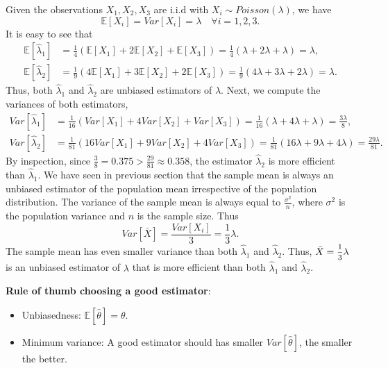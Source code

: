 \begin{solution}
    Given the observations $X_1, X_2, X_3$ are i.i.d with $X_i \sim Poisson(\lambda)$, we have
    \[
        \mathbb{E}[X_i] = Var[X_i] = \lambda \quad \forall i = 1,2,3.
    \]
    It is easy to see that 
    \begin{align*}
        \mathbb{E}[\hat{\lambda}_1] &= \frac{1}{4}(\mathbb{E}[X_1] + 2\mathbb{E}[X_2] + \mathbb{E}[X_3]) = \frac{1}{4}(\lambda + 2\lambda + \lambda) = \lambda,\\
        \mathbb{E}[\hat{\lambda}_2] &= \frac{1}{9}(4\mathbb{E}[X_1] + 3\mathbb{E}[X_2] + 2\mathbb{E}[X_3]) = \frac{1}{9}(4\lambda + 3\lambda + 2\lambda) = \lambda.
    \end{align*}
    Thus, both $\hat{\lambda}_1$ and $\hat{\lambda}_2$ are unbiased estimators of $\lambda$.
    Next, we compute the variances of both estimators,
    \begin{align*}
        Var[\hat{\lambda}_1] &= \frac{1}{16}(Var[X_1] + 4Var[X_2] + Var[X_3]) = \frac{1}{16}(\lambda + 4\lambda + \lambda) = \frac{3\lambda}{8},\\
        Var[\hat{\lambda}_2] &= \frac{1}{81}(16Var[X_1] + 9Var[X_2] + 4Var[X_3]) = \frac{1}{81}(16\lambda + 9\lambda + 4\lambda) = \frac{29\lambda}{81}.
    \end{align*}
    By inspection, since $\frac{3}{8} = 0.375 > \frac{29}{81} \approx 0.358$, the estimator $\hat{\lambda}_2$ is more efficient than $\hat{\lambda}_1$.
    We have seen in previous section that the sample mean is always an unbiased estimator of the population mean irrespective of the population distribution. 
    The variance of the sample mean is always equal to $\frac{\sigma^2}{n}$, where $\sigma^2$ is the population variance and $n$ is the sample size. Thus 
    \[
        Var[\bar{X}] = \frac{Var[X_i]}{3} = \frac{1}{3}\lambda.
    \]
    The sample mean has even smaller variance than both $\hat{\lambda}_1$ and $\hat{\lambda}_2$. Thus, $\bar{X} = \mfrac{1}{3}\lambda$ is an unbiased estimator of $\lambda$ that is more efficient than both $\hat{\lambda}_1$ and $\hat{\lambda}_2$.
\end{solution}

\textbf{Rule of thumb choosing a good estimator}:
\begin{itemize}
    \item Unbiasedness: $\mathbb{E}[\hat{\theta}] = \theta$.
    \item Minimum variance: A good estimator should has smaller $Var[\hat{\theta}]$, the smaller the better.
\end{itemize}


